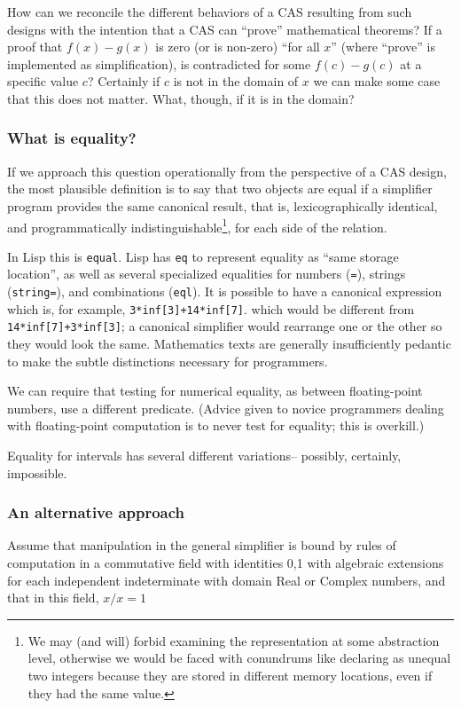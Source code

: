 \documentclass{article}
\begin{document}
How can we reconcile the different behaviors of a CAS resulting from
such designs with the intention that a CAS can ``prove'' mathematical
theorems?  If a proof that $f(x)-g(x)$ is zero (or is non-zero) ``for
all $x$'' (where ``prove'' is implemented as simplification), is
contradicted for some $f(c)-g(c)$ at a specific value $c$? Certainly
if $c$ is not in the domain of $x$ we can make some case that this
does not matter.  What, though, if it is in the domain?

\subsubsection{What is equality?}

If we approach this question operationally from the perspective of
a CAS design, the most plausible definition is to say that
two objects are equal if a simplifier program provides the same
canonical result, that is, lexicographically identical, and programmatically
indistinguishable\footnote
{We may (and will) forbid examining the representation at some abstraction
level, otherwise we would be faced with conundrums like declaring as unequal
two integers because they are stored in different memory locations, even if
they had the same value.}, for each side of the relation. 

In Lisp this is {\tt equal}. {Lisp has {\tt eq} to
represent equality as ``same storage location'', as well as several
specialized equalities for numbers ({\tt =}), strings ({\tt string=}),
and combinations ({\tt eql}).}  It is possible to have a canonical
expression which is, for example, {\tt 3*inf[3]+14*inf[7]}.  which
would be different from {\tt 14*inf[7]+3*inf[3]}; a canonical
simplifier would rearrange one or the other so they would look the
same. Mathematics texts are generally insufficiently pedantic to make
the subtle distinctions necessary for programmers.

We can require that testing for numerical equality, as between
floating-point numbers, use a different predicate. (Advice given to
novice programmers dealing with floating-point computation is to never
test for equality; this is overkill.)

Equality for intervals has several different variations-- possibly,
certainly, impossible.


\subsubsection{An alternative approach}
Assume that manipulation in the general simplifier is bound by rules
of computation in a commutative field with identities 0,1 with algebraic
extensions for each independent indeterminate with domain Real or Complex
numbers, and that in this field, $x/x=1$ 
\end{document}

